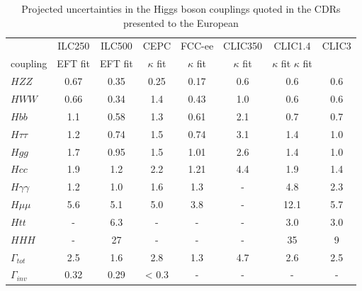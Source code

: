 \begin{table}[!htbp]
\begin{center}
\begin{tabular}{l|cc|c|c|ccc}
    &  ILC250      &   ILC500   & CEPC &  FCC-ee &
   CLIC350 & 
   CLIC1.4 & CLIC3 \\ 
coupling &   EFT fit & EFT fit & $\kappa$ fit &  $\kappa$ fit &
                                                                $\kappa$
                                                                fit &
                                                                      $\kappa$
                                                                      fit
   $\kappa$ fit & \\ \hline 
$HZZ$            &             0.67&   0.35    &   0.25   & 0.17     &  0.6     &     0.6    &   0.6     \\ 
$HWW$            &         0.66  &   0.34   &   1.4   &   0.43   &   1.0    &   0.6  &  0.6 \\ 
 $Hbb$            &              1.1  &  0.58   &  1.3    &    0.61  &   2.1    &  0.7  &  0.7 \\ 
$H\tau\tau$    &          1.2  &   0.74   &   1.5   &  0.74    &   3.1    &  1.4  &  1.0 \\ 
$Hgg$ &                      1.7  & 0.95       &  1.5    &  1.01    &   2.6    &   1.4   &  1.0  \\ 
$Hcc$                       &   1.9  &  1.2   &   2.2   &   1.21   &    4.4   &  1.9  &  1.4 \\ 
$H\gamma\gamma$ &  1.2 &   1.0     &  1.6    &   1.3   &    -   &  4.8  &  2.3 \\ 
$H\mu\mu$                &  5.6  &  5.1     &  5.0    &  3.8    &    -
& 12.1 &  5.7 \\ 
$Htt$  &                       -     &      6.3     &  -    &  -    &
-    & 3.0  &  3.0  \\ 
$HHH$                         &  -    &   27     &   -   &   -   &   -
& 35 &  9 \\ \hline 
$\Gamma_{tot}$             & 2.5  & 1.6    &   2.8    &  1.3     &
4.7    & 2.6  & 2.5 \\  
$\Gamma_{inv}$          &   0.32  & 0.29    &  < 0.3    &   -   &   -
& -  & - \\  \hline
\end{tabular}
\end{center}
\caption{ \label{tab:askthem}    Projected uncertainties in the Higgs
  boson couplings quoted in the CDRs presented to the European
}
\end{table}
